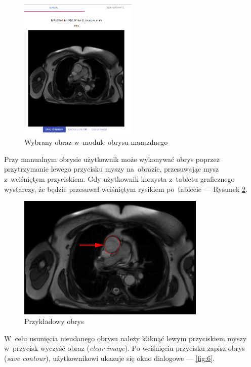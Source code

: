 \documentclass[a4paper,11pt,twoside,openright]{report}
\theoremstyle{definition}
\begin{document}
\pagebreak

\begin{figure}[h!]
	\center
	\includegraphics[width=0.5\textwidth]{4}
	\caption{Wybrany obraz w~module obrysu manualnego}
    	\label{fig:4}
\end{figure}

Przy manualnym obrysie użytkownik może wykonywać obrys poprzez przytrzymanie
lewego przycisku myszy na~obrazie, przesuwając mysz z~wciśniętym przyciskiem.
Gdy użytkownik korzysta z~tabletu graficznego wystarczy, że będzie przesuwał
wciśniętym rysikiem po~tablecie --- Rysunek \ref{fig:5}.

\begin{figure}[h!]
	\center
	\includegraphics[width=0.8\textwidth]{5}
	\caption{Przykładowy obrys}
    	\label{fig:5}
\end{figure}

\pagebreak

W~celu usunięcia nieudanego obrysu należy kliknąć lewym przyciskiem
myszy w~przycisk wyczyść obraz (\textit{clear image}). Po wciśnięciu przycisku zapisz obrys
(\textit{save contour}), użytkownikowi ukazuje się okno dialogowe --- \ref{fig:6}.
\end{document}
